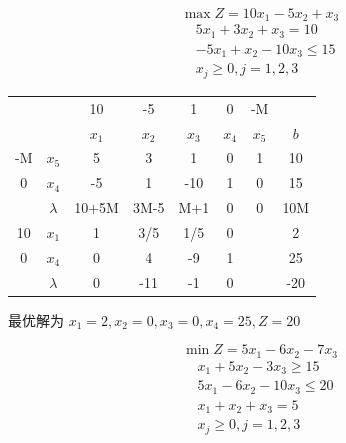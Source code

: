 \documentclass[../../main.tex]{subfiles}
\begin{document}
\begin{problem}
\begin{equation*}
    \max Z = 10x_1-5x_2+x_3
\end{equation*}
\begin{align*}
     & 5x_1+3x_2+x_3    =10               \\
     & -5x_1+x_2-10x_3  \leq 15           \\
     & x_j              \geq 0, j = 1,2,3
\end{align*}
\end{problem}

\begin{solution}
    \begin{table}[H]
        \centering
        \begin{tabular}{c|c|cccccc}

               &             & 10      & -5      & 1       & 0       & -M      &       \\
               &             & \(x_1\) & \(x_2\) & \(x_3\) & \(x_4\) & \(x_5\) & \(b\) \\
            \hline
            -M & \(x_5\)     & 5       & 3       & 1       & 0       & 1       & 10    \\
            0  & \(x_4\)     & -5      & 1       & -10     & 1       & 0       & 15    \\
               & \(\lambda\) & 10+5M   & 3M-5    & M+1     & 0       & 0       & 10M   \\
            \hline
            10 & \(x_1\)     & 1       & 3/5     & 1/5     & 0       &         & 2     \\
            0  & \(x_4\)     & 0       & 4       & -9      & 1       &         & 25    \\
               & \(\lambda\) & 0       & -11     & -1      & 0       &         & -20   \\
            \hline
        \end{tabular}
    \end{table}
    最优解为  \(x_1 = 2, x_2 = 0, x_3 = 0, x_4 = 25 , Z = 20\)
\end{solution}
\newpage
\begin{problem}
\begin{equation*}
    \min Z = 5x_1-6x_2-7x_3
\end{equation*}
\begin{align*}
     & x_1+5x_2-3x_3    \geq 15           \\
     & 5x_1-6x_2-10x_3  \leq 20           \\
     & x_1+x_2+x_3      = 5               \\
     & x_j              \geq 0, j = 1,2,3 \\
\end{align*}
\end{problem}
\end{document}
